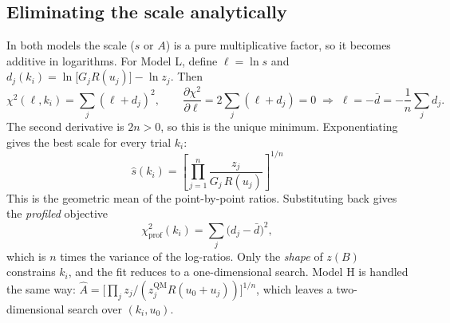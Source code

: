 \documentclass[11pt,a4paper]{article}
\newcommand{\QM}{\mathrm{QM}}
\begin{document}
\subsection{Eliminating the scale analytically}
\label{sec:profile}
In both models the scale ($s$ or $A$) is a pure multiplicative factor, so it becomes additive in logarithms. For Model L, define $\ell = \ln s$ and $d_j(k_i) = \ln\!\big[G_jR(u_j)\big] - \ln z_j$. Then
\[
\chi^2(\ell,k_i) = \sum_j(\ell + d_j)^2,\qquad
\frac{\partial\chi^2}{\partial \ell} = 2\sum_j(\ell+d_j) = 0
\;\Rightarrow\; \ell = -\bar d = -\frac1n\sum_j d_j .
\]
The second derivative is $2n>0$, so this is the unique minimum. Exponentiating gives the best scale for every trial $k_i$:
\begin{equation}
\boxed{\;\hat s(k_i) = \left[\prod_{j=1}^{n}\frac{z_j}{G_j\,R(u_j)}\right]^{1/n}\;}
\label{eq:shat}
\end{equation}
This is the geometric mean of the point-by-point ratios. Substituting back gives the \emph{profiled} objective
\begin{equation}
\chi^2_\text{prof}(k_i) = \sum_j\big(d_j - \bar d\big)^2 ,
\end{equation}
which is $n$ times the variance of the log-ratios. Only the \emph{shape} of $z(B)$ constrains $k_i$, and the fit reduces to a one-dimensional search. Model H is handled the same way: $\hat A = \big[\prod_j z_j/(z^{\QM}_jR(u_0+u_j))\big]^{1/n}$, which leaves a two-dimensional search over $(k_i, u_0)$.
\end{document}
